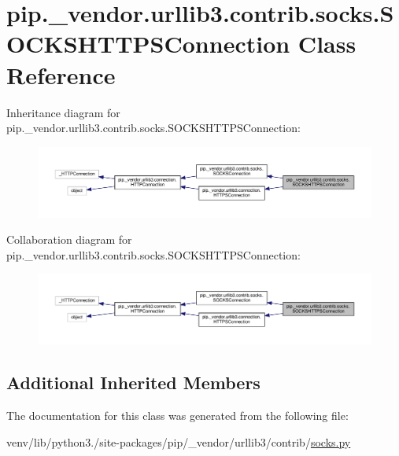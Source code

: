 \hypertarget{classpip_1_1__vendor_1_1urllib3_1_1contrib_1_1socks_1_1SOCKSHTTPSConnection}{}\section{pip.\+\_\+vendor.\+urllib3.\+contrib.\+socks.\+S\+O\+C\+K\+S\+H\+T\+T\+P\+S\+Connection Class Reference}
\label{classpip_1_1__vendor_1_1urllib3_1_1contrib_1_1socks_1_1SOCKSHTTPSConnection}


Inheritance diagram for pip.\+\_\+vendor.\+urllib3.\+contrib.\+socks.\+S\+O\+C\+K\+S\+H\+T\+T\+P\+S\+Connection\+:
\nopagebreak
\begin{figure}[H]
\begin{center}
\leavevmode
\includegraphics[width=350pt]{classpip_1_1__vendor_1_1urllib3_1_1contrib_1_1socks_1_1SOCKSHTTPSConnection__inherit__graph}
\end{center}
\end{figure}


Collaboration diagram for pip.\+\_\+vendor.\+urllib3.\+contrib.\+socks.\+S\+O\+C\+K\+S\+H\+T\+T\+P\+S\+Connection\+:
\nopagebreak
\begin{figure}[H]
\begin{center}
\leavevmode
\includegraphics[width=350pt]{classpip_1_1__vendor_1_1urllib3_1_1contrib_1_1socks_1_1SOCKSHTTPSConnection__coll__graph}
\end{center}
\end{figure}
\subsection*{Additional Inherited Members}


The documentation for this class was generated from the following file\+:\begin{DoxyCompactItemize}
\item 
venv/lib/python3./site-\/packages/pip/\+\_\+vendor/urllib3/contrib/\hyperlink{socks_8py}{socks.\+py}\end{DoxyCompactItemize}
